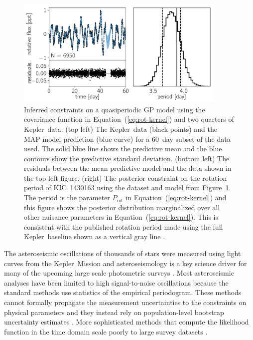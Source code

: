\documentclass[manuscript, letterpaper]{aastex6}
\makeatletter
\let\origsubsection\subsection
\renewcommand\subsection{\@ifstar{\starsubsection}{\nostarsubsection}}
\newcommand\nostarsubsection[1]{\subsectionprelude\origsubsection{#1}}
\newcommand\starsubsection[1]{\subsectionprelude\origsubsection*{#1}}
\newcommand\subsectionprelude{\vspace{1em}}
\newcommand{\project}[1]{\textsf{#1}}
\newcommand{\kepler}{\project{Kepler}}
\newcommand{\figureref}[1]{\ref{fig:#1}}
\newcommand{\Figure}[1]{Figure~\figureref{#1}}
\newcommand{\figurelabel}[1]{\label{fig:#1}}
\renewcommand{\eqref}[1]{\ref{eq:#1}}
\newcommand{\Eq}[1]{Equation~(\eqref{#1})}
\newcommand{\eq}[1]{\Eq{#1}}
\newcommand{\sectlabel}[1]{\label{sect:#1}}
\makeatother
\begin{document}
\begin{figure}[htbp]
\begin{center}
\includegraphics[width=0.9\textwidth]{figures/rotation/rotation.pdf}
\caption{Inferred constraints on a quasiperiodic GP model using the covariance
    function in \eq{rot-kernel} and two quarters of \kepler\ data.
(top left) The \kepler\ data (black points) and the MAP model
    prediction (blue curve) for a 60~day subset of the data used.
    The solid blue line shows the predictive mean and the blue contours show
    the predictive standard deviation.
(bottom left) The residuals between the mean predictive model and the data
    shown in the top left figure.
(right) The posterior constraint on the rotation period of KIC~1430163 using
    the dataset and model from \Figure{rotation}.
    The period is the parameter $P_\mathrm{rot}$ in \eq{rot-kernel} and this
    figure shows the posterior distribution marginalized over all other
    nuisance parameters in \eq{rot-kernel}.  This is consistent with the
    published rotation period made using the full
    \kepler\ baseline shown as a vertical gray line \citep{Mathur:2014}.
    \figurelabel{rotation}}
\end{center}
\end{figure}

\subsection{Example 4: Asteroseismic oscillations}\sectlabel{astero}

The asteroseismic oscillations of thousands of stars were measured using light
curves from the \kepler\ Mission \citep{Gilliland:2010, Huber:2011,
Chaplin:2011, Chaplin:2013, Stello:2013} and asteroseismology is a key science
driver for many of the upcoming large scale photometric surveys
\citep{Campante:2016, Rauer:2014, Gould:2015}.
Most asteroseismic analyses have been limited to high signal-to-noise
oscillations because the standard methods use statistics of the empirical
periodogram.
These methods cannot formally propagate the measurement uncertainties to the
constraints on physical parameters and they instead rely on population-level
bootstrap uncertainty estimates \citep{Huber:2009}.
More sophisticated methods that compute the likelihood function in the time
domain scale poorly to large survey datasets \citep{Brewer:2009,
Corsaro:2014}.
\end{document}
